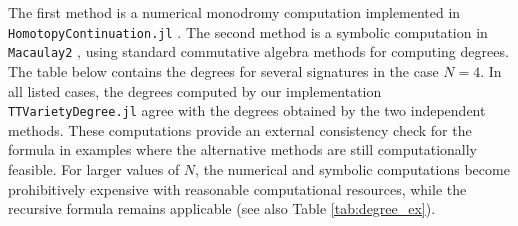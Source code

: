 \documentclass{article}
\theoremstyle{definition}
\begin{document}
\noindent The first method is a
numerical monodromy computation implemented in
\texttt{HomotopyContinuation.jl} \cite{Breiding_2018}. The second method is
a symbolic computation in \texttt{Macaulay2} \cite{M2}, using standard
commutative algebra methods for computing degrees. \\

The table below contains the degrees for several signatures in the case \(N=4\). In all listed
cases, the degrees computed by our implementation
\texttt{TTVarietyDegree.jl} agree with the degrees obtained by the two
independent methods. These computations provide an external consistency
check for the formula in examples where the alternative methods are still
computationally feasible. For larger values of \(N\), the numerical and
symbolic computations become prohibitively expensive with reasonable
computational resources, while the recursive formula remains applicable (see also Table \ref{tab:degree_ex}).

\begin{table}[H]
\centering
\tiny
{}
\caption{Degrees of \(V_{D,d}\) for several signatures with \(N=4\).
The displayed values were computed using \texttt{TTVarietyDegree.jl} and
independently checked using \texttt{HomotopyContinuation.jl} and
\texttt{Macaulay2}.}
\label{tab:degree_comparison_selected}
\end{table}


\printbibliography
\end{document}
